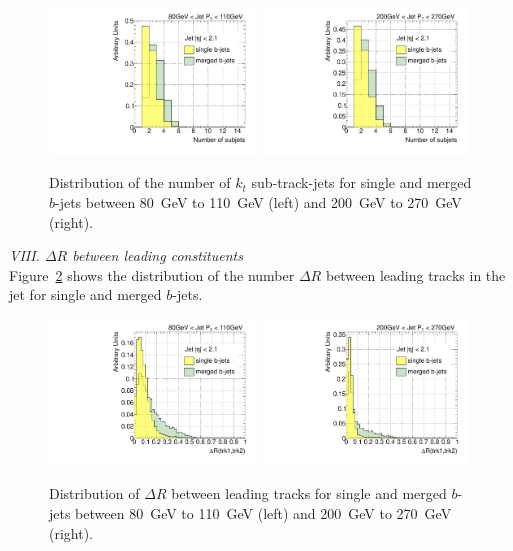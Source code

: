 \begin{figure}[tp]
\centering
\includegraphics[width=0.49\textwidth]{FIGS/VarsSingleMerged/Nsubjets080.pdf}
\includegraphics[width=0.49\textwidth]{FIGS/VarsSingleMerged/Nsubjets200.pdf}
\caption{Distribution of the number of $k_t$ sub-track-jets for single and merged $b$-jets between 80~GeV to 110~GeV (left) and 200~GeV to 270~GeV (right).}
\label{fig:nsubjetsinglemerged}
\end{figure}


{ \em VIII. $\Delta R$ between leading constituents}
\\[3mm]

Figure~\ref{fig:drtrk12singlemerged} shows the distribution of the number  $\Delta R$ between leading tracks in the jet for single and merged $b$-jets.
\\[3mm]

\begin{figure}[tp]
\centering
\includegraphics[width=0.49\textwidth]{FIGS/VarsSingleMerged/DRtrk12080.pdf}
\includegraphics[width=0.49\textwidth]{FIGS/VarsSingleMerged/DRtrk12200.pdf}
\caption{Distribution of $\Delta R$ between leading tracks for single and merged $b$-jets between 80~GeV to 110~GeV (left) and 200~GeV to 270~GeV (right).}
\label{fig:drtrk12singlemerged}
\end{figure}



